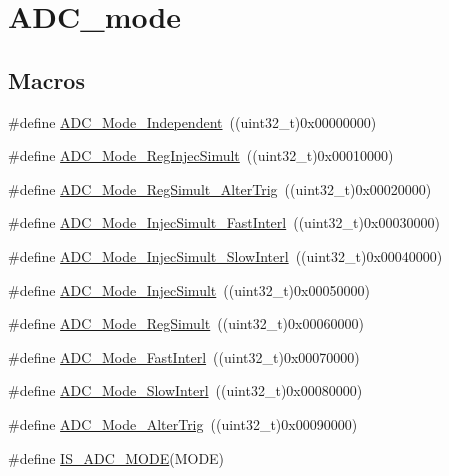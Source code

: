 \hypertarget{group___a_d_c__mode}{}\section{A\+D\+C\+\_\+mode}
\label{group___a_d_c__mode}
\subsection*{Macros}
\begin{DoxyCompactItemize}
\item 
\#define \mbox{\hyperlink{group___a_d_c__mode_ga2754d3a35559dc10e3d6a7d920e83432}{A\+D\+C\+\_\+\+Mode\+\_\+\+Independent}}~((uint32\+\_\+t)0x00000000)
\item 
\#define \mbox{\hyperlink{group___a_d_c__mode_ga487d5f0c506291c5d37b53198396fd1c}{A\+D\+C\+\_\+\+Mode\+\_\+\+Reg\+Injec\+Simult}}~((uint32\+\_\+t)0x00010000)
\item 
\#define \mbox{\hyperlink{group___a_d_c__mode_gae3d5fbf93f60d75534364bf9db78f632}{A\+D\+C\+\_\+\+Mode\+\_\+\+Reg\+Simult\+\_\+\+Alter\+Trig}}~((uint32\+\_\+t)0x00020000)
\item 
\#define \mbox{\hyperlink{group___a_d_c__mode_ga2fc8a737f7b2375309bccbcb7fdbbfeb}{A\+D\+C\+\_\+\+Mode\+\_\+\+Injec\+Simult\+\_\+\+Fast\+Interl}}~((uint32\+\_\+t)0x00030000)
\item 
\#define \mbox{\hyperlink{group___a_d_c__mode_gacb72230cb48a577907729d426be69c22}{A\+D\+C\+\_\+\+Mode\+\_\+\+Injec\+Simult\+\_\+\+Slow\+Interl}}~((uint32\+\_\+t)0x00040000)
\item 
\#define \mbox{\hyperlink{group___a_d_c__mode_ga2339cc471aaf2db02daa4aeb49e9f0d9}{A\+D\+C\+\_\+\+Mode\+\_\+\+Injec\+Simult}}~((uint32\+\_\+t)0x00050000)
\item 
\#define \mbox{\hyperlink{group___a_d_c__mode_ga71298f7453c2b4392a9c622328b3c93d}{A\+D\+C\+\_\+\+Mode\+\_\+\+Reg\+Simult}}~((uint32\+\_\+t)0x00060000)
\item 
\#define \mbox{\hyperlink{group___a_d_c__mode_ga843ecdd53625e2088e91819e43106a7a}{A\+D\+C\+\_\+\+Mode\+\_\+\+Fast\+Interl}}~((uint32\+\_\+t)0x00070000)
\item 
\#define \mbox{\hyperlink{group___a_d_c__mode_ga8b81e27e98dbc3d1e31452dbad167cd5}{A\+D\+C\+\_\+\+Mode\+\_\+\+Slow\+Interl}}~((uint32\+\_\+t)0x00080000)
\item 
\#define \mbox{\hyperlink{group___a_d_c__mode_ga5595f12dc485e301ba3bad0e165586c1}{A\+D\+C\+\_\+\+Mode\+\_\+\+Alter\+Trig}}~((uint32\+\_\+t)0x00090000)
\item 
\#define \mbox{\hyperlink{group___a_d_c__mode_ga4abf4c7de28a42d7b124c9e403a6e537}{I\+S\+\_\+\+A\+D\+C\+\_\+\+M\+O\+DE}}(M\+O\+DE)
\end{DoxyCompactItemize}


